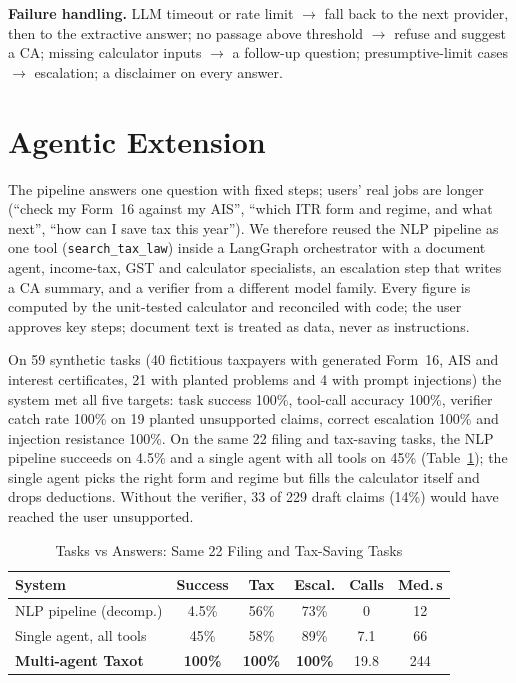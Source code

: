 \documentclass[conference]{IEEEtran}
\begin{document}
\textbf{Failure handling.} LLM timeout or rate limit $\to$ fall back to the next provider, then to the
extractive answer; no passage above threshold $\to$ refuse and suggest a CA; missing calculator inputs
$\to$ a follow-up question; presumptive-limit cases $\to$ escalation; a disclaimer on every answer.

\section{Agentic Extension}

The pipeline answers one question with fixed steps; users' real jobs are longer (``check my Form~16 against
my AIS'', ``which ITR form and regime, and what next'', ``how can I save tax this year''). We therefore reused
the NLP pipeline as one tool (\texttt{search\_tax\_law}) inside a LangGraph orchestrator with a document agent,
income-tax, GST and calculator specialists, an escalation step that writes a CA summary, and a verifier from
a different model family. Every figure is computed by the unit-tested calculator and reconciled with code;
the user approves key steps; document text is treated as data, never as instructions.

On 59 synthetic tasks (40 fictitious taxpayers with generated Form~16, AIS and interest certificates, 21 with
planted problems and 4 with prompt injections) the system met all five targets: task success 100\%, tool-call
accuracy 100\%, verifier catch rate 100\% on 19 planted unsupported claims, correct escalation 100\% and
injection resistance 100\%. On the same 22 filing and tax-saving tasks, the NLP pipeline succeeds on 4.5\%
and a single agent with all tools on 45\% (Table~\ref{tab:agents}); the single agent picks the right form and
regime but fills the calculator itself and drops deductions. Without the verifier, 33 of 229 draft claims
(14\%) would have reached the user unsupported.

\begin{table}[t]
\caption{Tasks vs Answers: Same 22 Filing and Tax-Saving Tasks}
\label{tab:agents}
\centering
\footnotesize
\setlength{\tabcolsep}{3pt}
\begin{tabular}{@{}lccccc@{}}
\toprule
System & Success & Tax & Escal. & Calls & Med.\,s \\
\midrule
NLP pipeline (decomp.) & 4.5\% & 56\% & 73\% & 0 & 12 \\
Single agent, all tools & 45\% & 58\% & 89\% & 7.1 & 66 \\
\textbf{Multi-agent Taxot} & \textbf{100\%} & \textbf{100\%} & \textbf{100\%} & 19.8 & 244 \\
\bottomrule
\end{tabular}
\end{table}
\end{document}
